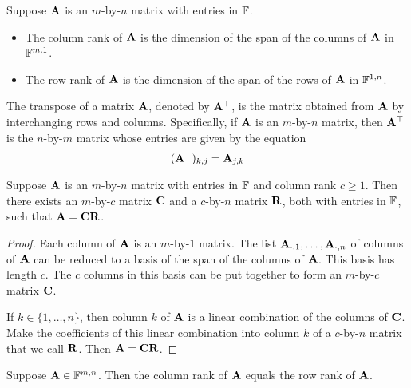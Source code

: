 \documentclass{extarticle}
\begin{document}
\begin{definition}
    Suppose \(\mathbf{A}\) is an \(m\)-by-\(n\) matrix with entries in \(\mathbb{F}\). 
    \begin{itemize}
        \item The column rank of \(\mathbf{A}\) is the dimension of the span of the columns of \(\mathbf{A}\)
        in \(\mathbb{F}^{m, 1}\). 
        \item The row rank of \(\mathbf{A}\) is the dimension of the span of the rows of \(\mathbf{A}\) in \(\mathbb{F}^{1, n}\). 
    \end{itemize}
\end{definition}

\begin{definition}
    The transpose of a matrix \(\mathbf{A}\), denoted by \(\mathbf{A}^\top\), is the matrix obtained from \(\mathbf{A}\)
    by interchanging rows and columns. Specifically, if \(\mathbf{A}\) is an \(m\)-by-\(n\) matrix, then 
    \(\mathbf{A}^\top\) is the \(n\)-by-\(m\) matrix whose entries are given by the equation 
    \[(\mathbf{A}^\top)_{k, j} = \mathbf{A}_{j, k}\]
\end{definition}

\begin{lemma}
    Suppose \(\mathbf{A}\) is an \(m\)-by-\(n\) matrix with entries in \(\mathbb{F}\) and column rank \(c \geq 1\). Then 
    there exists an \(m\)-by-\(c\) matrix \(\mathbf{C}\) and a \(c\)-by-\(n\) matrix \(\mathbf{R}\), both with entries in \(\mathbb{F}\), 
    such that \(\mathbf{A} = \mathbf{C} \mathbf{R}\). 
\end{lemma}

\begin{proof}
Each column of \(\mathbf{A}\) is an \(m\)-by-\(1\) matrix. The list \(\mathbf{A}_{\cdot, 1}, \ldots, \mathbf{A}_{\cdot, n}\)
of columns of \(\mathbf{A}\) can be reduced to a basis of the span of the columns of \(\mathbf{A}\). This 
basis has length \(c\). The \(c\) columns in this basis can be put together to form an \(m\)-by-\(c\) 
matrix \(\mathbf{C}\). 

If \(k \in \{1, \ldots, n\}\), then column \(k\) of \(\mathbf{A}\) is a linear combination 
of the columns of \(\mathbf{C}\). Make the coefficients of this linear combination into column 
\(k\) of a \(c\)-by-\(n\) matrix that we call \(\mathbf{R}\). Then \(\mathbf{A} = \mathbf{C} \mathbf{R}\). 
\end{proof}

\begin{thm}
    Suppose \(\mathbf{A} \in \mathbb{F}^{m, n}\). Then the column rank of \(\mathbf{A}\) equals the row rank of \(\mathbf{A}\). 
\end{thm}
\end{document}
